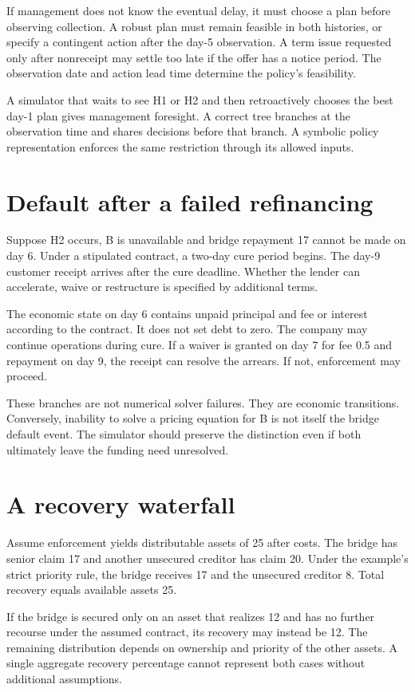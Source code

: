 If management does not know the eventual delay, it must choose a plan before observing collection. A robust plan must remain feasible in both histories, or specify a contingent action after the day-5 observation. A term issue requested only after nonreceipt may settle too late if the offer has a notice period. The observation date and action lead time determine the policy's feasibility.

A simulator that waits to see H1 or H2 and then retroactively chooses the best day-1 plan gives management foresight. A correct tree branches at the observation time and shares decisions before that branch. A symbolic policy representation enforces the same restriction through its allowed inputs.

\section{Default after a failed refinancing}
Suppose H2 occurs, B is unavailable and bridge repayment 17 cannot be made on day 6. Under a stipulated contract, a two-day cure period begins. The day-9 customer receipt arrives after the cure deadline. Whether the lender can accelerate, waive or restructure is specified by additional terms.

The economic state on day 6 contains unpaid principal and fee or interest according to the contract. It does not set debt to zero. The company may continue operations during cure. If a waiver is granted on day 7 for fee 0.5 and repayment on day 9, the receipt can resolve the arrears. If not, enforcement may proceed.

These branches are not numerical solver failures. They are economic transitions. Conversely, inability to solve a pricing equation for B is not itself the bridge default event. The simulator should preserve the distinction even if both ultimately leave the funding need unresolved.

\section{A recovery waterfall}
Assume enforcement yields distributable assets of 25 after costs. The bridge has senior claim 17 and another unsecured creditor has claim 20. Under the example's strict priority rule, the bridge receives 17 and the unsecured creditor 8. Total recovery equals available assets 25.

If the bridge is secured only on an asset that realizes 12 and has no further recourse under the assumed contract, its recovery may instead be 12. The remaining distribution depends on ownership and priority of the other assets. A single aggregate recovery percentage cannot represent both cases without additional assumptions.

